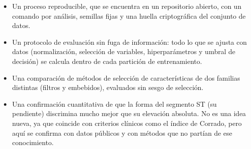 \begin{itemize}
  \item Un proceso reproducible, que se encuentra en un repositorio abierto, con un comando por análisis, semillas fijas y una huella criptográfica del conjunto de datos.
  \item Un protocolo de evaluación sin fuga de información: todo lo que se ajusta con datos (normalización, selección de variables, hiperparámetros y umbral de decisión) se calcula dentro de cada partición de entrenamiento.
  \item Una comparación de métodos de selección de características de dos familias distintas (filtros y embebidos), evaluados sin sesgo de selección.
  \item Una confirmación cuantitativa de que la forma del segmento ST (su pendiente) discrimina mucho mejor que su elevación absoluta. No es una idea nueva, ya que coincide con criterios clínicos como el índice de Corrado, pero aquí se confirma con datos públicos y con métodos que no partían de ese conocimiento.
\end{itemize}
